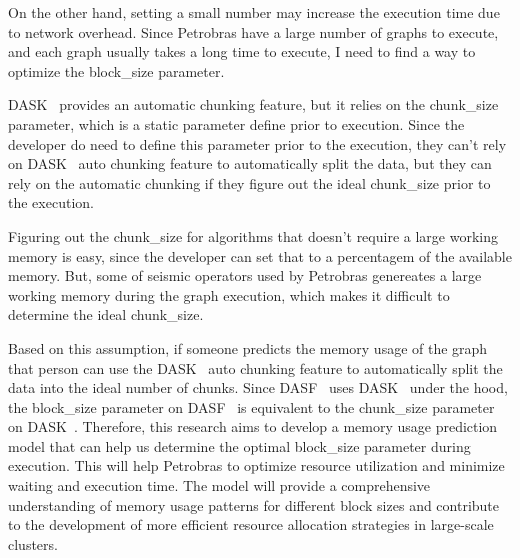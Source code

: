 On the other hand, setting a small number may increase the execution time due to network overhead.
Since Petrobras have a large number of graphs to execute, and each graph usually takes a long time to execute, I need to find a way to optimize the block\_size parameter.

DASK~\cite{dask} provides an automatic chunking feature, but it relies on the chunk\_size parameter, which is a static parameter define prior to execution.
Since the developer do need to define this parameter prior to the execution, they can't rely on DASK~\cite{dask} auto chunking feature to automatically split the data, but they can rely on the automatic chunking if they figure out the ideal chunk\_size prior to the execution.

Figuring out the chunk\_size for algorithms that doesn't require a large working memory is easy, since the developer can set that to a percentagem of the available memory.
But, some of seismic operators used by Petrobras genereates a large working memory during the graph execution, which makes it difficult to determine the ideal chunk\_size.

Based on this assumption, if someone predicts the memory usage of the graph that person can use the DASK~\cite{dask} auto chunking feature to automatically split the data into the ideal number of chunks.
Since DASF~\cite{dasf} uses DASK~\cite{dask} under the hood, the block\_size parameter on DASF~\cite{dasf} is equivalent to the chunk\_size parameter on DASK~\cite{dask}.
Therefore, this research aims to develop a memory usage prediction model that can help us determine the optimal block\_size parameter during execution.
This will help Petrobras to optimize resource utilization and minimize waiting and execution time.
The model will provide a comprehensive understanding of memory usage patterns for different block sizes and contribute to the development of more efficient resource allocation strategies in large-scale clusters.
